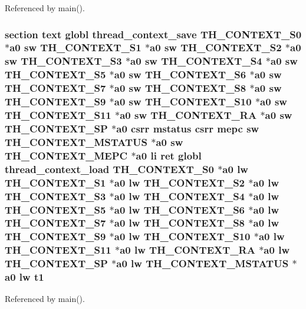Referenced by main().

\hypertarget{riscv_2atomic_8S_ae7a3f7baeb6769a5ca90b5626bf66259}{
\subsubsection[{t1}]{\setlength{\rightskip}{0pt plus 5cm}section text globl {\bf thread\-\_\-context\-\_\-save} {\bf T\-H\-\_\-\-C\-O\-N\-T\-E\-X\-T\-\_\-\-S0} $\ast${\bf a0} {\bf sw} {\bf T\-H\-\_\-\-C\-O\-N\-T\-E\-X\-T\-\_\-\-S1} $\ast${\bf a0} {\bf sw} {\bf T\-H\-\_\-\-C\-O\-N\-T\-E\-X\-T\-\_\-\-S2} $\ast${\bf a0} {\bf sw} {\bf T\-H\-\_\-\-C\-O\-N\-T\-E\-X\-T\-\_\-\-S3} $\ast${\bf a0} {\bf sw} {\bf T\-H\-\_\-\-C\-O\-N\-T\-E\-X\-T\-\_\-\-S4} $\ast${\bf a0} {\bf sw} {\bf T\-H\-\_\-\-C\-O\-N\-T\-E\-X\-T\-\_\-\-S5} $\ast${\bf a0} {\bf sw} {\bf T\-H\-\_\-\-C\-O\-N\-T\-E\-X\-T\-\_\-\-S6} $\ast${\bf a0} {\bf sw} {\bf T\-H\-\_\-\-C\-O\-N\-T\-E\-X\-T\-\_\-\-S7} $\ast${\bf a0} {\bf sw} {\bf T\-H\-\_\-\-C\-O\-N\-T\-E\-X\-T\-\_\-\-S8} $\ast${\bf a0} {\bf sw} {\bf T\-H\-\_\-\-C\-O\-N\-T\-E\-X\-T\-\_\-\-S9} $\ast${\bf a0} {\bf sw} {\bf T\-H\-\_\-\-C\-O\-N\-T\-E\-X\-T\-\_\-\-S10} $\ast${\bf a0} {\bf sw} {\bf T\-H\-\_\-\-C\-O\-N\-T\-E\-X\-T\-\_\-\-S11} $\ast${\bf a0} {\bf sw} {\bf T\-H\-\_\-\-C\-O\-N\-T\-E\-X\-T\-\_\-\-R\-A} $\ast${\bf a0} {\bf sw} {\bf T\-H\-\_\-\-C\-O\-N\-T\-E\-X\-T\-\_\-\-S\-P} $\ast${\bf a0} csrr {\bf mstatus} csrr {\bf mepc} {\bf sw} {\bf T\-H\-\_\-\-C\-O\-N\-T\-E\-X\-T\-\_\-\-M\-S\-T\-A\-T\-U\-S} $\ast${\bf a0} {\bf sw} {\bf T\-H\-\_\-\-C\-O\-N\-T\-E\-X\-T\-\_\-\-M\-E\-P\-C} $\ast${\bf a0} {\bf li} ret globl {\bf thread\-\_\-context\-\_\-load} {\bf T\-H\-\_\-\-C\-O\-N\-T\-E\-X\-T\-\_\-\-S0} $\ast${\bf a0} {\bf lw} {\bf T\-H\-\_\-\-C\-O\-N\-T\-E\-X\-T\-\_\-\-S1} $\ast${\bf a0} {\bf lw} {\bf T\-H\-\_\-\-C\-O\-N\-T\-E\-X\-T\-\_\-\-S2} $\ast${\bf a0} {\bf lw} {\bf T\-H\-\_\-\-C\-O\-N\-T\-E\-X\-T\-\_\-\-S3} $\ast${\bf a0} {\bf lw} {\bf T\-H\-\_\-\-C\-O\-N\-T\-E\-X\-T\-\_\-\-S4} $\ast${\bf a0} {\bf lw} {\bf T\-H\-\_\-\-C\-O\-N\-T\-E\-X\-T\-\_\-\-S5} $\ast${\bf a0} {\bf lw} {\bf T\-H\-\_\-\-C\-O\-N\-T\-E\-X\-T\-\_\-\-S6} $\ast${\bf a0} {\bf lw} {\bf T\-H\-\_\-\-C\-O\-N\-T\-E\-X\-T\-\_\-\-S7} $\ast${\bf a0} {\bf lw} {\bf T\-H\-\_\-\-C\-O\-N\-T\-E\-X\-T\-\_\-\-S8} $\ast${\bf a0} {\bf lw} {\bf T\-H\-\_\-\-C\-O\-N\-T\-E\-X\-T\-\_\-\-S9} $\ast${\bf a0} {\bf lw} {\bf T\-H\-\_\-\-C\-O\-N\-T\-E\-X\-T\-\_\-\-S10} $\ast${\bf a0} {\bf lw} {\bf T\-H\-\_\-\-C\-O\-N\-T\-E\-X\-T\-\_\-\-S11} $\ast${\bf a0} {\bf lw} {\bf T\-H\-\_\-\-C\-O\-N\-T\-E\-X\-T\-\_\-\-R\-A} $\ast${\bf a0} {\bf lw} {\bf T\-H\-\_\-\-C\-O\-N\-T\-E\-X\-T\-\_\-\-S\-P} $\ast${\bf a0} {\bf lw} {\bf T\-H\-\_\-\-C\-O\-N\-T\-E\-X\-T\-\_\-\-M\-S\-T\-A\-T\-U\-S} $\ast${\bf a0} {\bf lw} t1}}\label{riscv_2atomic_8S_ae7a3f7baeb6769a5ca90b5626bf66259}


Referenced by main().

